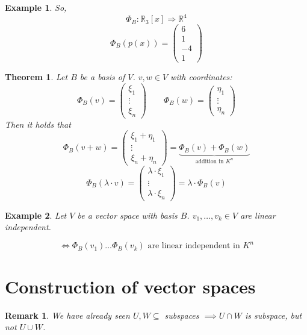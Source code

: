 \documentclass[a4paper,landscape,twocolumn]{article}
\newtheorem{theorem}{Theorem}[section]
\newtheorem{ex}{Example}[section]
\newtheorem{rem}{Remark}[section]
\begin{document}
\begin{ex}
  So,
  \[ \Phi_B: \mathbb R_3[x] \Rightarrow \mathbb R^4 \]
  \[ \Phi_B(p(x)) = \begin{pmatrix} 6 \\ 1 \\ -4 \\ 1 \end{pmatrix} \]
\end{ex}

\begin{theorem}
  \label{satz-3-38}
  Let $B$ be a basis of $V$.
  $v, w \in V$ with coordinates:
  \[ \Phi_B(v) = \begin{pmatrix} \xi_1 \\ \vdots \\ \xi_n \end{pmatrix} \qquad \Phi_B(w) = \begin{pmatrix} \eta_1 \\ \vdots \\ \eta_n \end{pmatrix} \]
  Then it holds that
  \[ \Phi_B(v+w) = \begin{pmatrix} \xi_1 + \eta_1 \\ \vdots \\ \xi_n + \eta_n \end{pmatrix} = \underbrace{\Phi_B(v) + \Phi_B(w)}_{\text{addition in } K^n} \]
  \[ \Phi_B(\lambda \cdot v) = \begin{pmatrix} \lambda \cdot \xi_1 \\ \vdots \\ \lambda \cdot \xi_n \end{pmatrix} = \lambda \cdot \Phi_B(v) \]
\end{theorem}

\begin{ex}
  \label{ex-3-39}
  Let $V$ be a vector space with basis $B$.
  $v_1, \dots, v_k \in V$ are linear independent.

  \[ \iff \Phi_B(v_1) \dots \Phi_B(v_k) \text{ are linear independent in } K^n \]
\end{ex}

\section{Construction of vector spaces}

\begin{rem}
  We have already seen $U, W \subseteq$ subspaces
  $\implies U \cap W$ is subspace, but not $U \cup W$.
\end{rem}
\end{document}
